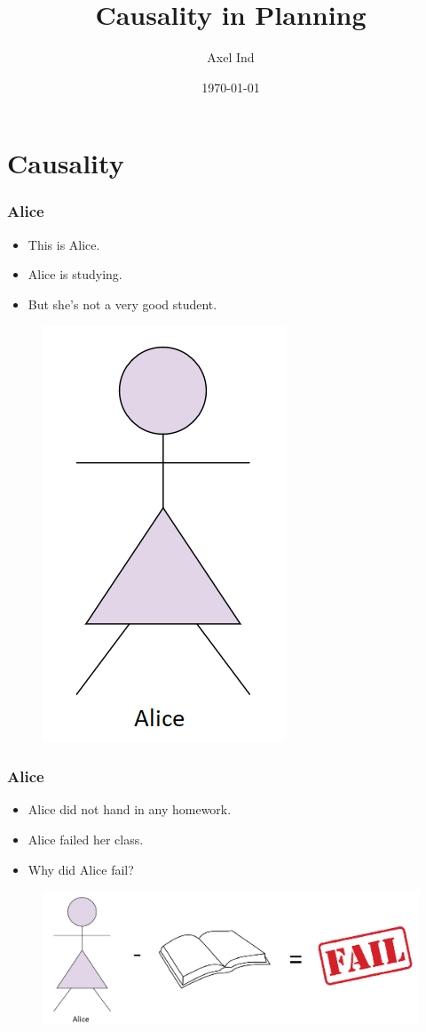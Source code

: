 \documentclass{beamer}
\title{Causality in Planning}
\author{Axel Ind}
\institute{ALU-Freiburg}
\date{\today}
\theoremstyle{plain}
\theoremstyle{definition}
\begin{document}
 
\frame{\titlepage}

\section{Causality}

\begin{frame}
\frametitle{Alice}
\begin{itemize}
\item This is Alice.
\item Alice is studying.
\item But she's not a very good student.
\end{itemize}

\begin{figure}
\includegraphics[scale=0.5]{alice}
\end{figure}

\end{frame}



\begin{frame}
\frametitle{Alice}
\begin{itemize}
\item Alice did not hand in any homework.
\item Alice failed her class.
\item Why did Alice fail?
\end{itemize}

\begin{figure}
\includegraphics[scale=0.3]{aliceFail}
\end{figure}

\end{frame}
\end{document}

